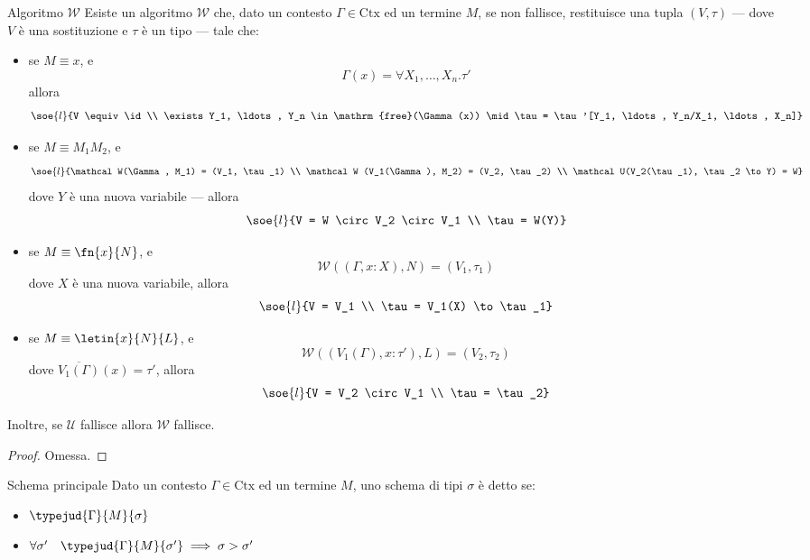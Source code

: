 \documentclass[a4paper, 12pt]{report}
\begin{document}
    \begin{framedthm}[breakable]{Algoritmo $\mathcal W$}
        Esiste un algoritmo $\mathcal W$  che, dato un contesto $\Gamma \in \mathrm{Ctx}$ ed un termine $M$, se non fallisce, restituisce una tupla $(V, \tau)$ --- dove $V$ è una sostituzione e $\tau$ è un tipo --- tale che:

        \begin{itemize}
            \item se $M \equiv x$, e $$\Gamma(x) = \forall X_1, \ldots, X_n.\tau'$$ allora $$\soe{l}{V \equiv \id \\ \exists Y_1, \ldots, Y_n \in \mathrm{free}(\Gamma(x)) \mid \tau = \tau'[Y_1, \ldots, Y_n/X_1, \ldots, X_n]}$$
            \item se $M \equiv M_1 M_2$, e $$\soe{l}{\mathcal W(\Gamma, M_1) = (V_1, \tau_1) \\ \mathcal W (V_1(\Gamma), M_2) = (V_2, \tau_2) \\ \mathcal U(V_2(\tau_1), \tau_2 \to Y) = W}$$ dove $Y$ è una nuova variabile --- allora $$\soe{l}{V = W \circ V_2 \circ V_1 \\ \tau = W(Y)}$$ 
            \item se $M \equiv \fn{x}{N}$, e $$\mathcal W((\Gamma, x:X), N) = (V_1, \tau_1)$$ dove $X$ è una nuova variabile, allora $$\soe{l}{V = V_1 \\ \tau = V_1(X) \to \tau_1}$$
            \item se $M \equiv \letin{x}{N}{L}$, e $$\mathcal W((V_1(\Gamma), x: \tau'), L) = (V_2, \tau_2)$$ dove $\overline{V_1(\Gamma)}(x) = \tau'$, allora $$\soe{l}{V = V_2 \circ V_1 \\ \tau = \tau_2}$$
        \end{itemize}
        
        Inoltre, se $\mathcal U$ fallisce allora $\mathcal W$ fallisce.
    \end{framedthm}

    \begin{proof}
        Omessa.
    \end{proof}

    \begin{frameddefn}{Schema principale}
        Dato un contesto $\Gamma \in \mathrm{Ctx}$ ed un termine $M$, uno schema di tipi $\sigma$ è detto  se:

        \begin{itemize}
            \item $\typejud{\Gamma}{M}{\sigma}$
            \item $\forall \sigma' \quad \typejud{\Gamma}{M}{\sigma'} \implies \sigma > \sigma'$
        \end{itemize}
    \end{frameddefn}
\end{document}
